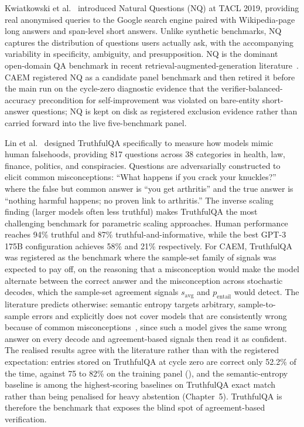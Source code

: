 Kwiatkowski et al.~\cite{kwiatkowski-etal-2019-natural} introduced Natural Questions (NQ) at TACL 2019, providing real anonymised queries to the Google search engine paired with Wikipedia-page long answers and span-level short answers. Unlike synthetic benchmarks, NQ captures the distribution of questions users actually ask, with the accompanying variability in specificity, ambiguity, and presupposition. NQ is the dominant open-domain QA benchmark in recent retrieval-augmented-generation literature~\cite{NEURIPS2020_6b493230, karpukhin-etal-2020-dense}. CAEM registered NQ as a candidate panel benchmark and then retired it before the main run on the cycle-zero diagnostic evidence that the verifier-balanced-accuracy precondition for self-improvement was violated on bare-entity short-answer questions; NQ is kept on disk as registered exclusion evidence rather than carried forward into the live five-benchmark panel.

Lin et al.~\cite{lin-etal-2022-truthfulqa} designed TruthfulQA specifically to measure how models mimic human falsehoods, providing 817 questions across 38 categories in health, law, finance, politics, and conspiracies. Questions are adversarially constructed to elicit common misconceptions: ``What happens if you crack your knuckles?'' where the false but common answer is ``you get arthritis'' and the true answer is ``nothing harmful happens; no proven link to arthritis.'' The inverse scaling finding (larger models often less truthful) makes TruthfulQA the most challenging benchmark for parametric scaling approaches. Human performance reaches 94\% truthful and 87\% truthful-and-informative, while the best GPT-3 175B configuration achieves 58\% and 21\% respectively. For CAEM, TruthfulQA was registered as the benchmark where the sample-set family of signals was expected to pay off, on the reasoning that a misconception would make the model alternate between the correct answer and the misconception across stochastic decodes, which the sample-set agreement signals $s_{\text{avg}}$ and $p_{\text{entail}}$ would detect. The literature predicts otherwise: semantic entropy targets arbitrary, sample-to-sample errors and explicitly does not cover models that are consistently wrong because of common misconceptions~\cite{farquhar2024semantic}, since such a model gives the same wrong answer on every decode and agreement-based signals then read it as confident. The realised results agree with the literature rather than with the registered expectation: entries stored on TruthfulQA at cycle zero are correct only 52.2\% of the time, against 75 to 82\% on the training panel (), and the semantic-entropy baseline is among the highest-scoring baselines on TruthfulQA exact match rather than being penalised for heavy abstention (Chapter~5). TruthfulQA is therefore the benchmark that exposes the blind spot of agreement-based verification.

